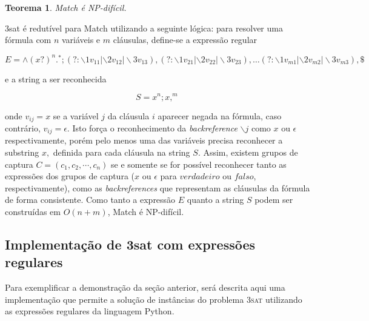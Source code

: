 \documentclass[a4paper,12pt,oneside,onecolumn]{uerj}
\newtheorem{theorem}{Teorema}
\newenvironment{proof}[1][Demonstração]{\begin{trivlist}
\item[\hskip \labelsep \emph{#1}:]}{\end{trivlist}}
\newcommand{\qed}{\nobreak \ifvmode \relax \else
      \ifdim\lastskip<1.5em \hskip-\lastskip
      \hskip1.5em plus0em minus0.5em \fi \nobreak
      \vrule height0.75em width0.5em depth0.25em\fi}
\begin{document}
\begin{theorem}
{\sc Match} é NP-difícil.
\end{theorem}
\begin{proof}
{\sc 3sat} é redutível para {\sc Match} utilizando a seguinte lógica: para resolver uma fórmula com $n$ variáveis e $m$ cláusulas, define-se a expressão regular

\setlength\abovedisplayskip{0pt}
\begin{equation*}
            E = 
                   \wedge (x?)^n .^*;
                   (?:\backslash 1v_{11}|\backslash 2 v_{12}|\backslash 3 v_{13}),
                   (?:\backslash 1v_{21}|\backslash 2 v_{22}|\backslash 3 v_{23}),                   
                   \ldots
                   (?:\backslash 1v_{m1}|\backslash 2 v_{m2}|\backslash 3 v_{m3}),                   
                    \$ 
\end{equation*}

\noindent e a string a ser reconhecida

\setlength\abovedisplayskip{0pt}
\begin{equation*}
S = x^n;x,^m
\end{equation*}

\noindent onde $v_{ij} = x$ se a variável $j$ da cláusula $i$ aparecer negada na fórmula, caso contrário, $v_{ij} = \epsilon$. Isto força o reconhecimento da \emph{backreference} $\backslash j$ como $x$ ou $\epsilon$ respectivamente, porém pelo menos uma das variáveis precisa reconhecer a substring $x,$ definida para cada cláusula na string $S$. Assim, existem grupos de captura $C = (c_1, c_2, \cdots, c_n)$ se e somente se for possível reconhecer tanto as expressões dos grupos de captura ($x$ ou $\epsilon$ para $verdadeiro$ ou $falso$, respectivamente), como as \emph{backreferences} que representam as cláusulas da fórmula de forma consistente. Como tanto a expressão $E$ quanto a string $S$ podem ser construídas em $O(n+m)$, {\sc Match} é NP-difícil. \qed
\end{proof}

\subsection{Implementação de {\sc 3sat} com expressões regulares}

Para exemplificar a demonstração da seção anterior, será descrita aqui uma implementação que permite a solução de instâncias do problema \textsc{3sat} utilizando as expressões regulares da linguagem Python.
\end{document}
